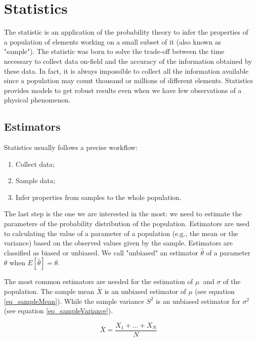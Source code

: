 \section{Statistics} \label{secStatistics}

The statistic is an application of the probability theory to infer the properties of a population of elements working on a small subset of it (also known as "sample"). The statistic was born to solve the trade-off between the time necessary to collect data on-field and the accuracy of the information obtained by these data. In fact, it is always impossible to collect all the information available since a population may count thousand or millions of different elements. Statistics provides models to get robust results even when we have few observations of a physical phenomenon.

\subsection{Estimators} \label{secEstimators}

Statistics usually follows a precise workflow:
\begin{enumerate}
    \item Collect data; 
    \item Sample data;
    \item Infer properties from samples to the whole population.
\end{enumerate}

The last step is the one we are interested in the most: we need to estimate the parameters of the probability distribution of the population. Estimators are used to calculating the value of a parameter of a population (e.g., the mean or the variance) based on the observed values given by the sample. Estimators are classified as biased or unbiased. We call "unbiased" an estimator $\hat{\theta}$ of a parameter $\theta$ when $E\left[\hat{\theta}\right]=\theta$.\par

The most common estimators are needed for the estimation of $\mu\ $ and $\sigma $ of the population. The sample mean $\bar{X}$ is an unbiased estimator of $\mu$ (see equation \ref{eq_sampleMean}). While the sample variance $S^2$ is an unbiased estimator for $\sigma^2$ (see equation \ref{eq_sampleVariance}).

\begin{equation}
\bar{X}=\frac{X_1+\ldots+X_N}{N}
\label{eq_sampleMean}
\end{equation}

